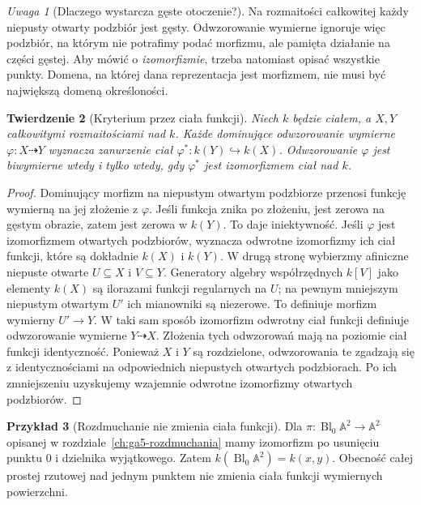 \documentclass[11pt,a4paper,openany]{report}
\numberwithin{equation}{section}
\theoremstyle{plain}
\newtheorem{twierdzenie}{Twierdzenie}[section]
\theoremstyle{definition}
\newtheorem{przyklad}[twierdzenie]{Przykład}
\theoremstyle{remark}
\newtheorem{uwaga}[twierdzenie]{Uwaga}
\newcommand{\A}{\mathbb A}
\begin{document}
\begin{uwaga}[Dlaczego wystarcza gęste otoczenie?]
Na rozmaitości całkowitej każdy niepusty otwarty
podzbiór jest gęsty. Odwzorowanie wymierne ignoruje
więc podzbiór, na którym nie potrafimy podać morfizmu,
ale pamięta działanie na części gęstej. Aby mówić o
\emph{izomorfizmie}, trzeba natomiast opisać wszystkie punkty.
Domena, na której dana reprezentacja jest morfizmem,
nie musi być największą domeną określoności.
\end{uwaga}

\begin{twierdzenie}[Kryterium przez ciała funkcji]
\label{tw:ga8-function-fields}
Niech $k$ będzie ciałem, a $X,Y$ całkowitymi rozmaitościami
nad $k$. Każde dominujące odwzorowanie wymierne
$\varphi:X\dashrightarrow Y$ wyznacza zanurzenie ciał
$\varphi^*:k(Y)\hookrightarrow k(X)$.
Odwzorowanie $\varphi$ jest biwymierne wtedy i tylko
wtedy, gdy $\varphi^*$ jest izomorfizmem ciał nad $k$.
\end{twierdzenie}
\begin{proof}
Dominujący morfizm na niepustym otwartym podzbiorze
przenosi funkcję wymierną na jej złożenie z $\varphi$.
Jeśli funkcja znika po złożeniu, jest zerowa na gęstym
obrazie, zatem jest zerowa w $k(Y)$. To daje iniektywność.
Jeśli $\varphi$ jest izomorfizmem otwartych podzbiorów,
wyznacza odwrotne izomorfizmy ich ciał funkcji, które
są dokładnie $k(X)$ i $k(Y)$.
W drugą stronę wybierzmy afiniczne niepuste otwarte
$U\subseteq X$ i $V\subseteq Y$. Generatory algebry
współrzędnych $k[V]$ jako elementy $k(X)$ są ilorazami
funkcji regularnych na $U$; na pewnym mniejszym
niepustym otwartym $U'$ ich mianowniki są niezerowe.
To definiuje morfizm wymierny $U'\to Y$.
W taki sam sposób izomorfizm odwrotny ciał funkcji
definiuje odwzorowanie wymierne $Y\dashrightarrow X$.
Złożenia tych odwzorowań mają na poziomie ciał funkcji
identyczność. Ponieważ $X$ i $Y$ są rozdzielone,
odwzorowania te zgadzają się z identycznościami na
odpowiednich niepustych otwartych podzbiorach.
Po ich zmniejszeniu uzyskujemy wzajemnie odwrotne
izomorfizmy otwartych podzbiorów.
\end{proof}

\begin{przyklad}[Rozdmuchanie nie zmienia ciała funkcji]
Dla $\pi:\operatorname{Bl}_0\A^2\to\A^2$ opisanej
w rozdziale~\ref{ch:ga5-rozdmuchania} mamy izomorfizm
po usunięciu punktu $0$ i dzielnika wyjątkowego.
Zatem $k(\operatorname{Bl}_0\A^2)=k(x,y)$.
Obecność całej prostej rzutowej nad jednym punktem
nie zmienia ciała funkcji wymiernych powierzchni.
\end{przyklad}
\end{document}

